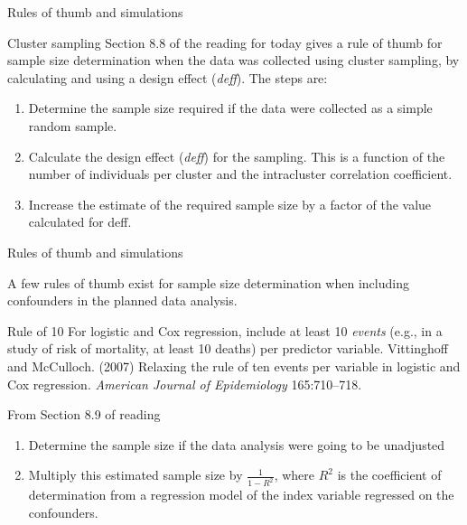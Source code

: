 \documentclass[ignorenonframetext,]{beamer}
\begin{document}
\begin{frame}{Rules of thumb and simulations}

\begin{block}{Cluster sampling}
Section 8.8 of the reading for today gives a rule of thumb for sample size determination when the data was collected using cluster sampling, by calculating and using a design effect (\textit{deff}). The steps are: 
\begin{enumerate}
  \item Determine the sample size required if the data were collected as a simple random sample. 
  \item Calculate the design effect (\textit{deff}) for the sampling. This is a function of the number of individuals per cluster and the intracluster correlation coefficient. 
  \item Increase the estimate of the required sample size by a factor of the value calculated for deff. 
\end{enumerate}
\end{block}

\end{frame}

\begin{frame}{Rules of thumb and simulations}

A few rules of thumb exist for sample size determination when including
confounders in the planned data analysis.

\begin{block}{Rule of 10}
For logistic and Cox regression, include at least 10 \textit{events} (e.g., in a study of risk of mortality, at least 10 deaths) per predictor variable. 
\footnotesize{Vittinghoff and McCulloch. (2007) Relaxing the rule of ten events per variable in logistic and Cox regression. \textit{American Journal of Epidemiology} 165:710--718.}
\end{block}

\begin{block}{From Section 8.9 of reading}
\begin{enumerate}
  \item Determine the sample size if the data analysis were going to be unadjusted
  \item Multiply this estimated sample size by $\frac{1}{1-R^2}$, where $R^2$ is the coefficient of determination from a regression model of the index variable regressed on the confounders. 
\end{enumerate}
\end{block}

\end{frame}
\end{document}
